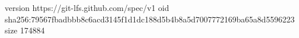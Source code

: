 version https://git-lfs.github.com/spec/v1
oid sha256:79567fbadbbb8c6acd3145f1d1dc188d5b4b8a5d7007772169ba65a8d5596223
size 174884
